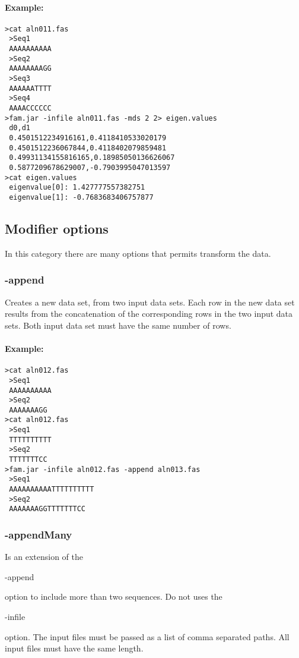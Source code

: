 \documentclass[a4paper, twoside,10pt]{article}
\begin{document}
\paragraph{Example:}
\begin{verbatim}
>cat aln011.fas
 >Seq1
 AAAAAAAAAA
 >Seq2
 AAAAAAAAGG
 >Seq3
 AAAAAATTTT
 >Seq4
 AAAACCCCCC
>fam.jar -infile aln011.fas -mds 2 2> eigen.values
 d0,d1
 0.4501512234916161,0.4118410533020179
 0.4501512236067844,0.4118402079859481
 0.49931134155816165,0.18985050136626067
 0.5877209678629007,-0.7903995047013597
>cat eigen.values
 eigenvalue[0]: 1.427777557382751
 eigenvalue[1]: -0.7683683406757877
\end{verbatim}

\subsection{Modifier options}
In this category there are many options that permits transform the data.

\subsubsection{-append}
Creates a new data set, from two input data sets. Each row in the new data set
results from the concatenation of the corresponding rows in the two input data
sets. Both input data set must have the same number of rows. 

\paragraph{Example:}
\begin{verbatim}
>cat aln012.fas
 >Seq1
 AAAAAAAAAA
 >Seq2
 AAAAAAAGG
>cat aln012.fas
 >Seq1
 TTTTTTTTTT
 >Seq2
 TTTTTTTCC
>fam.jar -infile aln012.fas -append aln013.fas
 >Seq1
 AAAAAAAAAATTTTTTTTTT
 >Seq2
 AAAAAAAGGTTTTTTTCC
\end{verbatim}

\subsubsection{-appendMany}
Is an extension of the \begin{tt}-append\end{tt} option to include more than
two sequences. Do not uses the \begin{tt}-infile\end{tt} option. The input files
must be passed as a list of comma separated paths. All input files must have the
same length.
\end{document}
